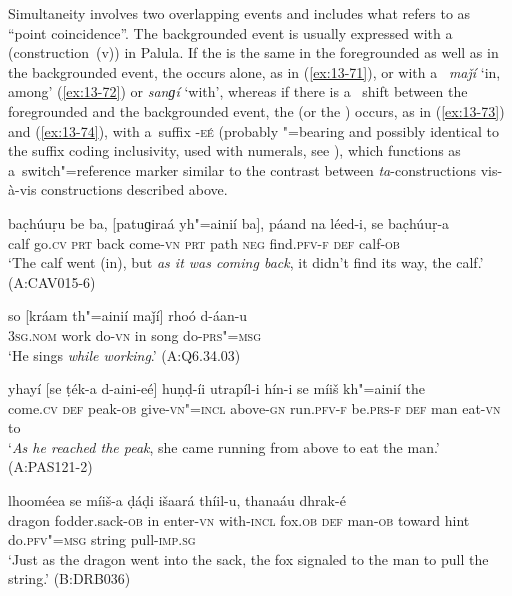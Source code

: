 Simultaneity involves two overlapping events and includes what
\citet[330]{givon2001b} refers to as ``point coincidence''. The backgrounded event
\citep[254--255]{thompsonetal2007} is usually expressed with a~ (construction~(v)) in
Palula. If the  is the same in the foregrounded as well as in the backgrounded event, the
 occurs alone, as in (\ref{ex:13-71}), or with a~ \textit{maǰí} `in,
among' (\ref{ex:13-72}) or \textit{sanɡí} `with', whereas if there is a~ shift between
the foregrounded and the backgrounded event, the  (or the ) occurs, as in
(\ref{ex:13-73}) and (\ref{ex:13-74}), with a~suffix \textsc{-eé} (probably
"=bearing and possibly identical to the suffix coding inclusivity, used with numerals, see ), which functions as a~switch"=reference marker similar to the contrast between
\textit{ta}-constructions vis-à-vis  constructions described above.

\begin{exe}
\ex
\label{ex:13-71}
\gll bac̣húuṛu be ba, [patuɡiraá yh"=ainií ba], páand na léed-i, se bac̣húuṛ-a \\
calf go.\textsc{cv} \textsc{prt } back come-\textsc{vn }  \textsc{prt} path \textsc{neg} find.\textsc{pfv-f} \textsc{def} calf-\textsc{ob}  \\
\glt `The calf went (in), but \textit{as it was coming back}, it didn't find its way, the calf.' (A:CAV015-6)

\ex
\label{ex:13-72}
\gll so [kráam th"=ainií maǰí] rhoó d-áan-u  \\
\textsc{3sg.nom} work do-\textsc{vn} in song do-\textsc{prs"=msg}  \\
\glt `He sings \textit{while working}.' (A:Q6.34.03)

\ex
\label{ex:13-73}
\gll yhayí [se ṭék-a d-aini-eé] huṇḍ-íi utrapíl-i hín-i se míiš kh"=ainií the \\
come.\textsc{cv} \textsc{def} peak-\textsc{ob} give-\textsc{vn"=incl} above-\textsc{gn} run.\textsc{pfv-f}  be.\textsc{prs-f } \textsc{def} man eat-\textsc{vn} to  \\
\glt `\textit{As he reached the peak}, she came running from above to eat the man.' (A:PAS121-2)

\ex
\label{ex:13-74}
 lhooméea se míiš-a ḍáḍi išaará thíil-u, thanaáu dhrak-é \\
dragon fodder.sack-\textsc{ob} in enter-\textsc{vn} with-\textsc{incl}  fox.\textsc{ob} \textsc{def} man-\textsc{ob} toward hint do.\textsc{pfv"=msg} string pull-\textsc{imp.sg}  \\
\glt `Just as the dragon went into the sack, the fox signaled to the man to pull the string.' (B:DRB036)
\end{exe}

